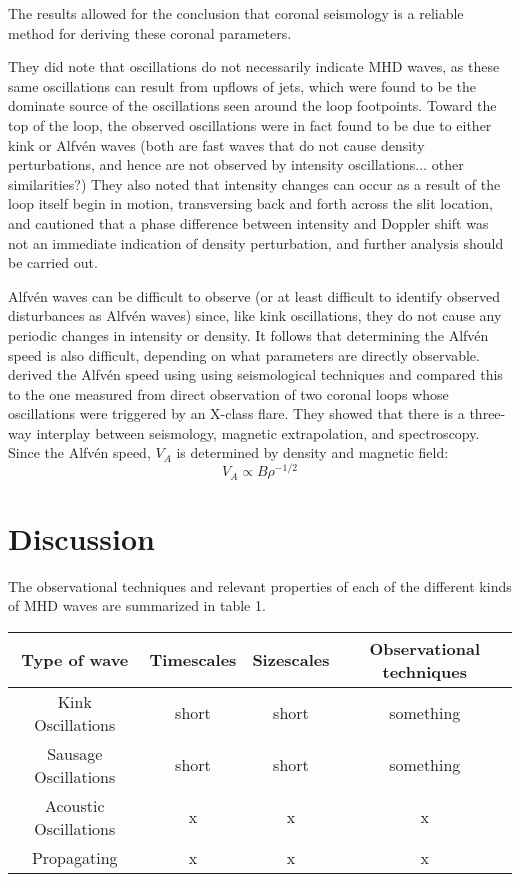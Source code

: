 \documentclass[preprint2]{aastex}
\begin{document}
The results allowed for the conclusion that coronal seismology is a
reliable method for deriving these coronal parameters.

They did note that oscillations do not necessarily indicate MHD waves,
as these same oscillations can result from upflows of jets, which were
found to be the dominate source of the oscillations seen around the loop
footpoints. Toward the top of the loop, the observed oscillations were
in fact found to be due to either kink or Alfv\'en waves
(both are fast waves that do not cause density perturbations, and
hence are not observed by intensity oscillations$\ldots$ other
similarities?) They also noted that intensity changes can occur as
a result of the loop itself begin in motion, transversing back and
forth across the slit location, and cautioned that a phase difference
between intensity and Doppler shift was not an immediate indication
of density perturbation, and further analysis should be carried out.

Alfv\'en waves can be difficult to observe (or at least difficult to
identify observed disturbances as Alfv\'en waves) since, like kink
oscillations, they do not cause any periodic changes in intensity or density.
It follows that determining the Alfv\'en speed is also difficult,
depending on what parameters are directly observable.
\cite{tor_2} derived the Alfv\'en speed using using seismological techniques
and compared this to the one measured from direct observation of two
coronal loops whose oscillations were triggered by an X-class flare.
They showed that there is a three-way interplay between seismology,
magnetic extrapolation, and spectroscopy. Since the Alfv\'en speed, $V_A$
is determined by density and magnetic field:
\begin{equation}
    V_A \propto B\rho^{-1/2}
\end{equation}


\section{Discussion}\label{disc}
The observational techniques and relevant properties of each of the different
kinds of MHD waves are summarized in table 1.
\begin{table*}[ht]
    \centering
    \begin{tabular}{c c c c}
        \hline\hline
        Type of wave &
        Timescales &
        Sizescales &
        Observational techniques\\
        \hline
        Kink Oscillations & short & short & something\\
        Sausage Oscillations & short & short & something\\
        Acoustic Oscillations & x & x & x\\
        Propagating & x & x & x\\
        \hline\hline
    \end{tabular}
\end{table*}
\end{document}
